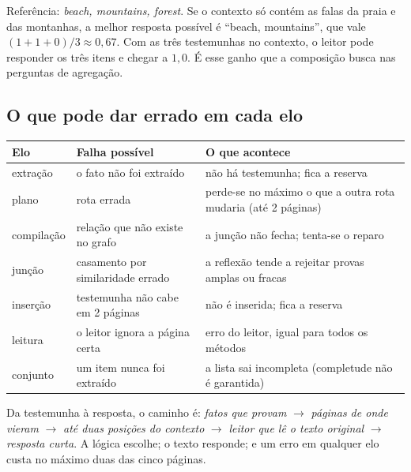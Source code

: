 \documentclass[11pt]{article}
\begin{document}
\begin{exemplo}
Referência: \emph{beach, mountains, forest}. Se o contexto só contém as falas
da praia e das montanhas, a melhor resposta possível é ``beach, mountains'',
que vale $(1+1+0)/3\approx0{,}67$. Com as três testemunhas no contexto, o
leitor pode responder os três itens e chegar a $1{,}0$. É esse ganho que a
composição busca nas perguntas de agregação.
\end{exemplo}

\subsection{O que pode dar errado em cada elo}

\begin{center}
\small
\begin{tabularx}{\textwidth}{@{}l>{\raggedright}X>{\raggedright\arraybackslash}X@{}}
\toprule
Elo & Falha possível & O que acontece \\
\midrule
extração & o fato não foi extraído & não há testemunha; fica a reserva \\
plano & rota errada & perde-se no máximo o que a outra rota mudaria (até 2 páginas) \\
compilação & relação que não existe no grafo & a junção não fecha; tenta-se o reparo \\
junção & casamento por similaridade errado & a reflexão tende a rejeitar provas amplas ou fracas \\
inserção & testemunha não cabe em 2 páginas & não é inserida; fica a reserva \\
leitura & o leitor ignora a página certa & erro do leitor, igual para todos os métodos \\
conjunto & um item nunca foi extraído & a lista sai incompleta (completude não é garantida) \\
\bottomrule
\end{tabularx}
\end{center}

\begin{resumo}
Da testemunha à resposta, o caminho é:
\emph{fatos que provam} $\to$ \emph{páginas de onde vieram} $\to$
\emph{até duas posições do contexto} $\to$ \emph{leitor que lê o texto
original} $\to$ \emph{resposta curta}. A lógica escolhe; o texto responde; e
um erro em qualquer elo custa no máximo duas das cinco páginas.
\end{resumo}
\end{document}
